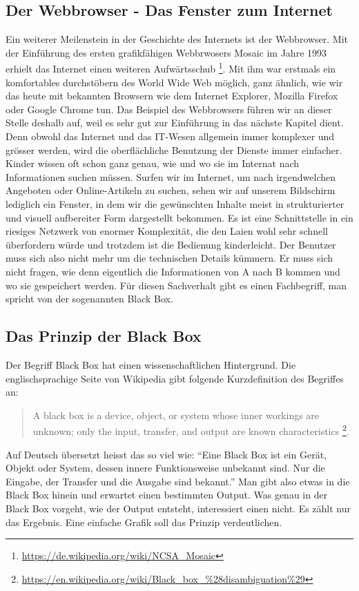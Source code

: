 \subsection{Der Webbrowser - Das Fenster zum Internet}
Ein weiterer Meilenstein in der Geschichte des Internets ist der Webbrowser. Mit der Einführung des ersten grafikfähigen Webbrwosers Mosaic im Jahre 1993 erhielt das Internet einen weiteren Aufwärtsschub
\footnote{\url{https://de.wikipedia.org/wiki/NCSA_Mosaic}}. 
Mit ihm war erstmals ein komfortables durchstöbern des World Wide Web möglich, ganz ähnlich, wie wir das heute mit bekannten Browsern wie dem Internet Explorer, Mozilla Firefox oder Google Chrome tun. Das Beispiel des Webbrowsers führen wir an dieser Stelle deshalb auf, weil es sehr gut zur Einführung in das nächste Kapitel dient.
Denn obwohl das Internet und das IT-Wesen allgemein immer komplexer und grösser werden, wird die oberflächliche Benutzung der Dienste immer einfacher. Kinder wissen oft schon ganz genau, wie und wo sie im Internat nach Informationen suchen müssen. Surfen wir im Internet, um nach irgendwelchen Angeboten oder Online-Artikeln zu suchen, sehen wir auf unserem Bildschirm lediglich ein Fenster, in dem wir die gewünschten Inhalte meist in strukturierter und visuell aufbereiter Form dargestellt bekommen. Es ist eine Schnittstelle in ein riesiges Netzwerk von enormer Komplexität, die den Laien wohl sehr schnell überfordern würde und trotzdem ist die Bedienung kinderleicht. Der Benutzer muss sich also nicht mehr um die technischen Details kümmern. Er muss sich nicht fragen, wie denn eigentlich die Informationen von A nach B kommen und wo sie gespeichert werden. Für diesen Sachverhalt gibt es einen Fachbegriff, man spricht von der sogenannten Black Box.

\subsection{Das Prinzip der Black Box}
Der Begriff Black Box hat einen wissenschaftlichen Hintergrund. Die englischsprachige Seite von Wikipedia gibt folgende Kurzdefinition des Begriffes an: 

\begin{quote} 
A black box is a device, object, or system whose inner workings are unknown; only the input, transfer, and output are known characteristics
\footnote{\url{https://en.wikipedia.org/wiki/Black_box_\%28disambiguation\%29}}.
\end{quote}

Auf Deutsch übersetzt heisst das so viel wie: ``Eine Black Box ist ein Gerät, Objekt oder System, dessen innere Funktionsweise unbekannt sind. Nur die Eingabe, der Transfer und die Ausgabe sind bekannt.''
Man gibt also etwas in die Black Box hinein und erwartet einen bestimmten Output. Was genau in der Black Box vorgeht, wie der Output entsteht, interessiert einen nicht. Es zählt nur das Ergebnis. Eine einfache Grafik soll das Prinzip verdeutlichen. 

